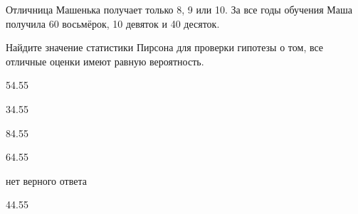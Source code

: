 
\begin{question}
Отличница Машенька получает только 8, 9 или 10. За все годы обучения
Маша получила 60 восьмёрок, 10 девяток и 40 десяток.

Найдите значение статистики Пирсона для проверки гипотезы о том, все
отличные оценки имеют равную вероятность.
\begin{answerlist}
  \item 54.55
  \item 34.55
  \item 84.55
  \item 64.55
  \item нет верного ответа
  \item 44.55
\end{answerlist}
\end{question}



